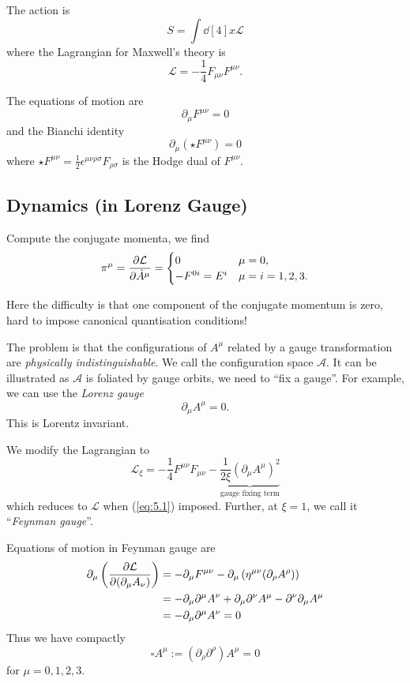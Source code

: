 \documentclass[a4paper,11pt]{article}
\begin{document}
	The action is 
	\[
		S = \int \dd[4]{x} \mathcal{L}
	\]
	where the Lagrangian for Maxwell's theory is
	\[
		\mathcal{L} = - \frac{1}{4} F _{\mu \nu} F ^{\mu \nu}.
	\]
	
	The equations of motion are
	\[
		\partial_\mu F ^{\mu \nu} = 0
	\]
	and the Bianchi identity
	\[
		\partial_\mu (\star F ^{\mu \nu}) = 0
	\]
	where $\star F ^{\mu \nu} = \frac{1}{2} \epsilon ^{\mu \nu \rho \sigma} F _{\rho \sigma}$ is the Hodge dual of $F ^{\mu \nu}$.

	\subsection{Dynamics (in Lorenz Gauge)}
	Compute the conjugate momenta, we find
	\[
		\pi^\mu = \pdv{\mathcal{L}}{\dot A^\mu} = \begin{cases}
			0 & \mu = 0,\\
			- F ^{0i} = E ^{i} & \mu = i = 1,2,3.
		\end{cases}
	\]

	Here the difficulty is that one component of the conjugate momentum is zero, hard to impose canonical quantisation conditions!

	The problem is that the configurations of $A ^\mu$ related by a gauge transformation are \emph{physically indistinguishable}. We call the configuration space $\mathcal{A}$. It can be illustrated as  $\mathcal{A}$ is foliated by gauge orbits, we need to ``fix a gauge''. For example, we can use the \emph{Lorenz gauge}
	\begin{equation}
		\partial_\mu A^\mu = 0.
		\label{eq:5.1}
	\end{equation}
	This is Lorentz invariant.

	We modify the Lagrangian to 
	\[
		\mathcal{L}_\xi = - \frac{1}{4} F ^{\mu \nu} F _{\mu \nu} - \underbrace{\frac{1}{2 \xi} \left( \partial_\mu A^\mu \right)^2}_{\text{gauge fixing term}}
	\]
	which reduces to $\mathcal{L}$ when (\ref{eq:5.1}) imposed. Further, at $\xi = 1$, we call it ``\emph{Feynman gauge}''.

	Equations of motion in Feynman gauge are 
	\begin{align*}
		\partial_\mu \left( \pdv{\mathcal{L}}{(\partial_\mu A_\nu)} \right) &= - \partial_\mu F ^{\mu \nu}
		- \partial_\mu \left( \eta ^{\mu \nu} (\partial_\rho A^\rho) \right)\\
		 & = - \partial_\mu \partial^\mu A^\nu + \partial_\mu \partial^\nu A^\mu - \partial^\nu \partial_\mu A^\mu\\
		 & = - \partial_\mu \partial^\mu A^\nu = 0
	\end{align*}
	Thus we have compactly 
	\[
		\square A^\mu := (\partial_\rho \partial^\rho) A^\mu = 0
	\]
	for $\mu = 0,1,2,3$.
\end{document}
